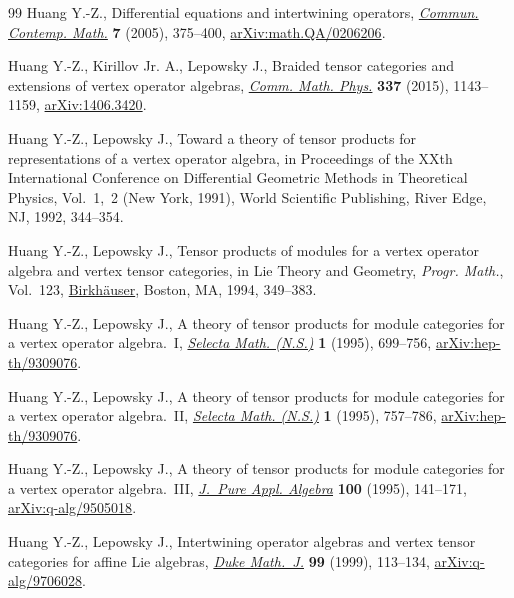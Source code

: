 \documentclass[10pt,a4paper]{amsart}
\numberwithin{equation}{section}
\begin{document}
\begin{thebibliography}{99}
Huang Y.-Z., Differential equations and intertwining operators,
 \href{https://doi.org/10.1142/S0219199705001799}{\textit{Commun. Contemp.
 Math.}} \textbf{7} (2005), 375--400,
 \href{http://arxiv.org/abs/math.QA/0206206}{arXiv:math.QA/0206206}.

Huang Y.-Z., Kirillov Jr. A., Lepowsky J., Braided tensor categories and
 extensions of vertex operator algebras,
 \href{https://doi.org/10.1007/s00220-015-2292-1}{\textit{Comm. Math. Phys.}}
 \textbf{337} (2015), 1143--1159,
 \href{http://arxiv.org/abs/1406.3420}{arXiv:1406.3420}.

Huang Y.-Z., Lepowsky J., Toward a theory of tensor products for representations
 of a vertex operator algebra, in Proceedings of the {XX}th {I}nternational
 {C}onference on {D}ifferential {G}eometric {M}ethods in {T}heoretical
 {P}hysics, {V}ol.~1,~2 ({N}ew {Y}ork, 1991), World Scientific Publishing,
 River Edge, NJ, 1992, 344--354.

Huang Y.-Z., Lepowsky J., Tensor products of modules for a vertex operator
 algebra and vertex tensor categories, in Lie {T}heory and {G}eometry,
 \textit{Progr. Math.}, Vol.~123,
 \href{https://doi.org/10.1007/978-1-4612-0261-5_13}{Birkh\"auser}, Boston,
 MA, 1994, 349--383.

Huang Y.-Z., Lepowsky J., A theory of tensor products for module categories for
 a vertex operator algebra.~{I},
 \href{https://doi.org/10.1007/BF01587908}{\textit{Selecta Math. (N.S.)}}
 \textbf{1} (1995), 699--756,
 \href{http://arxiv.org/abs/hep-th/9309076}{arXiv:hep-th/9309076}.

Huang Y.-Z., Lepowsky J., A theory of tensor products for module categories for
 a vertex operator algebra.~{II},
 \href{https://doi.org/10.1007/BF01587908}{\textit{Selecta Math. (N.S.)}}
 \textbf{1} (1995), 757--786,
 \href{http://arxiv.org/abs/hep-th/9309076}{arXiv:hep-th/9309076}.

Huang Y.-Z., Lepowsky J., A theory of tensor products for module categories for
 a vertex operator algebra.~{III},
 \href{https://doi.org/10.1016/0022-4049(95)00049-3}{\textit{J.~Pure Appl.
 Algebra}} \textbf{100} (1995), 141--171,
 \href{http://arxiv.org/abs/q-alg/9505018}{arXiv:q-alg/9505018}.

Huang Y.-Z., Lepowsky J., Intertwining operator algebras and vertex tensor
 categories for affine {L}ie algebras,
 \href{https://doi.org/10.1215/S0012-7094-99-09905-2}{\textit{Duke Math.~J.}}
 \textbf{99} (1999), 113--134,
 \href{http://arxiv.org/abs/q-alg/9706028}{arXiv:q-alg/9706028}.


\end{thebibliography}
\end{document}
